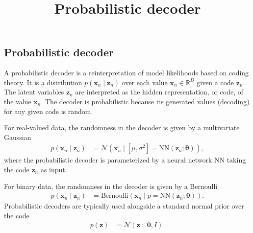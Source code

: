 \title{Probabilistic decoder}

\subsection{Probabilistic decoder}

A probabilistic decoder is a reinterpretation of model likelihoods
based on coding theory. It is a distribution $p(\mathbf{x}_n\mid \mathbf{z}_n)$  over each value
$\mathbf{x}_n\in\mathbb{R}^D$ given a code $\mathbf{z}_n$. The latent
variables $\mathbf{z}_n$ are interpreted as the hidden representation, or code, of the value
$\mathbf{x}_n$. The decoder is probabilistic because its generated
values (decoding) for any given code is random.

For real-valued data,
the randomness in the decoder is given by a multivariate Gaussian
\begin{align*}
  p(\mathbf{x}_n\mid\mathbf{z}_n)
  &=
  \mathcal{N}(\mathbf{x}_n\mid [\mu,\sigma^2]=\mathrm{NN}(\mathbf{z}_n; \mathbf{\theta})),
\end{align*}
where the probabilistic decoder is parameterized by a neural network
$\mathrm{NN}$ taking the code $\mathbf{z}_n$ as input.

For binary data,
the randomness in the decoder is given by a Bernoulli
\begin{align*}
  p(\mathbf{x}_n\mid\mathbf{z}_n)
  &=
  \text{Bernoulli}(\mathbf{x}_n\mid p=\mathrm{NN}(\mathbf{z}_n; \mathbf{\theta})).
\end{align*}
Probabilistic decoders are typically used alongside a standard normal
prior over the code
\begin{align*}
  p(\mathbf{z})
  &=
  \mathcal{N}(\mathbf{z} \;;\; \mathbf{0}, I).
\end{align*}

